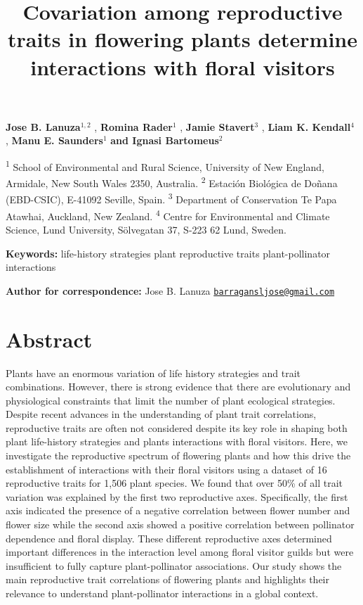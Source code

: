 \documentclass[
  12pt,
  a4paper,
]{article}
\title{\singlespacing \vspace{-1.6cm} \LARGE Covariation among reproductive traits in flowering plants determine interactions with floral visitors}
\author{}
\date{\vspace{-2.5em}}
\begin{document}
\maketitle

\vspace{-1.4cm}

\singlespacing

\textbf{Jose B. Lanuza$^{1,2}$} , \textbf{Romina Rader$^{1}$} , \textbf{Jamie Stavert$^{3}$} , \textbf{Liam K. Kendall$^{4}$} , \textbf{Manu E. Saunders$^{1}$} 
\textbf{and Ignasi Bartomeus$^{2}$}

\small

\textsuperscript{1} School of Environmental and Rural Science, University of New England, Armidale, New South Wales 2350, Australia. \textsuperscript{2} Estación Biológica de Doñana (EBD-CSIC), E-41092 Seville, Spain. \textsuperscript{3} Department of Conservation \textbar{} Te Papa Atawhai, Auckland, New Zealand. \textsuperscript{4} Centre for Environmental and Climate Science, Lund University, Sölvegatan 37, S-223 62 Lund, Sweden.

\doublespacing
\normalsize

\textbf{Keywords:} life-history strategies \textbar{} plant reproductive traits \textbar{} plant-pollinator interactions

\textbf{Author for correspondence:} Jose B. Lanuza \textbar{} \href{mailto:barragansljose@gmail.com}{\nolinkurl{barragansljose@gmail.com}}

\hypertarget{abstract}{%
\section{Abstract}\label{abstract}}

Plants have an enormous variation of life history strategies and trait combinations. However, there is strong evidence that there are evolutionary and physiological constraints that limit the number of plant ecological strategies. Despite recent advances in the understanding of plant trait correlations, reproductive traits are often not considered despite its key role in shaping both plant life-history strategies and plants interactions with floral visitors. Here, we investigate the reproductive spectrum of flowering plants and how this drive the establishment of interactions with their floral visitors using a dataset of 16 reproductive traits for 1,506 plant species. We found that over 50\% of all trait variation was explained by the first two reproductive axes. Specifically, the first axis indicated the presence of a negative correlation between flower number and flower size while the second axis showed a positive correlation between pollinator dependence and floral display. These different reproductive axes determined important differences in the interaction level among floral visitor guilds but were insufficient to fully capture plant-pollinator associations. Our study shows the main reproductive trait correlations of flowering plants and highlights their relevance to understand plant-pollinator interactions in a global context.
\end{document}
